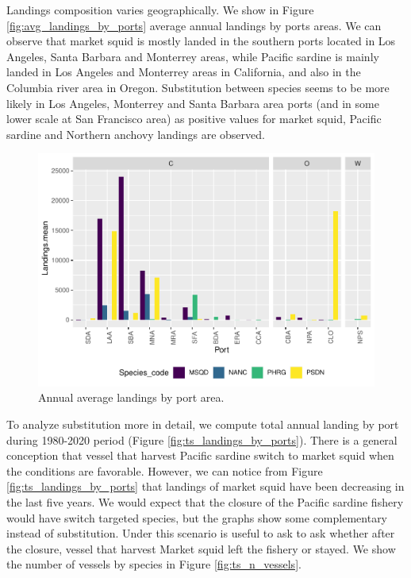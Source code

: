 Landings composition varies geographically. We show in Figure
\ref{fig:avg_landings_by_ports} average annual landings by ports areas.
We can observe that market squid is mostly landed in the southern ports
located in Los Angeles, Santa Barbara and Monterrey areas, while Pacific
sardine is mainly landed in Los Angeles and Monterrey areas in
California, and also in the Columbia river area in Oregon. Substitution
between species seems to be more likely in Los Angeles, Monterrey and
Santa Barbara area ports (and in some lower scale at San Francisco area)
as positive values for market squid, Pacific sardine and Northern
anchovy landings are observed.

\begin{Schunk}
\begin{figure}
\includegraphics{econ_landings_paper_files/figure-latex/avg_landings_by_port-1} \caption{Annual average landings by port area.\label{fig:avg_landings_by_ports}}\label{fig:avg_landings_by_port}
\end{figure}
\end{Schunk}

To analyze substitution more in detail, we compute total annual landing
by port during 1980-2020 period (Figure \ref{fig:ts_landings_by_ports}).
There is a general conception that vessel that harvest Pacific sardine
switch to market squid when the conditions are favorable. However, we
can notice from Figure \ref{fig:ts_landings_by_ports} that landings of
market squid have been decreasing in the last five years. We would
expect that the closure of the Pacific sardine fishery would have switch
targeted species, but the graphs show some complementary instead of
substitution. Under this scenario is useful to ask to ask whether after
the closure, vessel that harvest Market squid left the fishery or
stayed. We show the number of vessels by species in Figure
\ref{fig:ts_n_vessels}.

